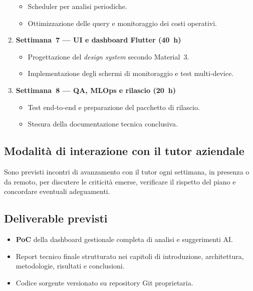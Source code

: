 \begin{enumerate}
        \begin{itemize}
            \item Scheduler per analisi periodiche.
            \item Ottimizzazione delle query e monitoraggio dei costi operativi.
        \end{itemize}
    \item \textbf{Settimana~7 — UI e dashboard Flutter (40~h)}
        \begin{itemize}
            \item Progettazione del \textit{design system} secondo Material~3.
            \item Implementazione degli schermi di monitoraggio e test multi‑device.
        \end{itemize}
    \item \textbf{Settimana~8 — QA, MLOps e rilascio (20~h)}
        \begin{itemize}
            \item Test end‑to‑end e preparazione del pacchetto di rilascio.
            \item Stesura della documentazione tecnica conclusiva.
        \end{itemize}
\end{enumerate}

\subsection{Modalità di interazione con il tutor aziendale}

Sono previsti incontri di avanzamento con il tutor ogni settimana, in presenza o da remoto, per discutere le criticità emerse, verificare il rispetto del piano e concordare eventuali adeguamenti.

\subsection{Deliverable previsti}

\begin{itemize}
    \item \textbf{PoC} della dashboard gestionale completa di analisi e suggerimenti AI.
    \item Report tecnico finale strutturato nei capitoli di introduzione, architettura, metodologie, risultati e conclusioni.
    \item Codice sorgente versionato su repository Git proprietaria.
\end{itemize}

\newpage
